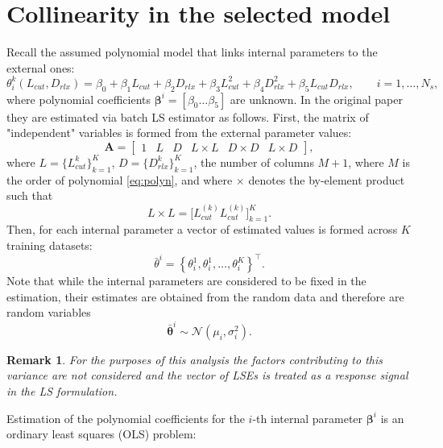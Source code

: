 \documentclass[a4paper,11pt,twoside]{article}
\theoremstyle{mytheoremstyle}
\newtheorem{remark}{Remark}[section]
\begin{document}
\section{Collinearity in the selected model}
\par Recall the assumed polynomial model that links internal parameters to the external ones:
\begin{equation}\label{eq:polyn}
\theta^{k}_{i}(L_{cut},D_{rlx}) = \beta_0 + \beta_1 L_{cut} + \beta_2 D_{rlx} + \beta_3 L_{cut}^{2} + \beta_4 D_{rlx}^{2} + \beta_5 L_{cut} D_{rlx}, \qquad i=1,\dots,N_s,
\end{equation}
where polynomial coefficients $\mathbf{\beta}^i = \left[ \beta_0 \dots \beta_5 \right]$ are unknown. In the original paper \cite{Wei2008} they are estimated via batch LS estimator as follows. First, the matrix of "independent" variables is formed from the external parameter values:
\begin{equation}
\mathbf{A} = \left[\begin{array}{cccccc}
1 & L& D& L\times L& D\times D& L\times D
\end{array}\right],
\end{equation}
where $L = \{L_{cut}^{k}\}^{K}_{k=1}$, $D = \{D_{rlx}^{k}\}^{K}_{k=1}$, the number of columns $M + 1$, where $M$ is the order of polynomial \eqref{eq:polyn}, and where $\times$ denotes the by-element product such that
\begin{equation*}
L\times L = \Big[ L_{cut}^{(k)} L_{cut}^{(k)}\Big]^{K}_{k=1}.
\end{equation*}
Then, for each internal parameter a vector of estimated values is formed across $K$ training datasets:
\begin{equation*}
\bar{\theta}^i = \left\{ \theta^{1}_{i}, \theta^{1}_{i}, \dots, \theta^{K}_{i} \right\}^{\top}.
\end{equation*}
Note that while the internal parameters are considered to be fixed in the estimation, their estimates are obtained from the random data and therefore are random variables 
\begin{equation*}
\bar{\mathbf{\theta}}^i \sim \mathcal{N}(\mu_i, \sigma^{2}_{i}).
\end{equation*}
\begin{remark}
For the purposes of this analysis the factors contributing to this variance are not considered and the vector of LSEs is treated as a response signal in the LS formulation.
\end{remark}
Estimation of the polynomial coefficients for the $i$-th internal parameter $\mathbf{\beta}^i$ is an ordinary least squares (OLS) problem:
\end{document}
